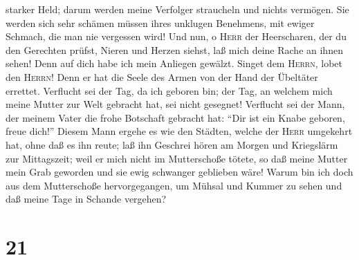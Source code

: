 starker Held; darum werden meine Verfolger straucheln und nichts
vermögen. Sie werden sich sehr schämen müssen ihres unklugen Benehmens,
mit ewiger Schmach, die man nie vergessen wird!  Und nun,
o \textsc{Herr} der Heerscharen, der du den Gerechten prüfst, Nieren und
Herzen siehst, laß mich deine Rache an ihnen sehen! Denn auf dich habe
ich mein Anliegen gewälzt.  Singet dem \textsc{Herrn},
lobet den \textsc{Herrn}! Denn er hat die Seele des Armen von der Hand
der Übeltäter errettet.  Verflucht sei der Tag, da ich
geboren bin; der Tag, an welchem mich meine Mutter zur Welt gebracht
hat, sei nicht gesegnet!  Verflucht sei der Mann, der
meinem Vater die frohe Botschaft gebracht hat: ``Dir ist ein Knabe
geboren, freue dich!''  Diesem Mann ergehe es wie den
Städten, welche der \textsc{Herr} umgekehrt hat, ohne daß es ihn reute;
laß ihn Geschrei hören am Morgen und Kriegslärm zur Mittagszeit;
 weil er mich nicht im Mutterschoße tötete, so daß meine
Mutter mein Grab geworden und sie ewig schwanger geblieben wäre!
 Warum bin ich doch aus dem Mutterschoße hervorgegangen,
um Mühsal und Kummer zu sehen und daß meine Tage in Schande vergehen?

\hypertarget{section-20}{%
\section{21}\label{section-20}}

